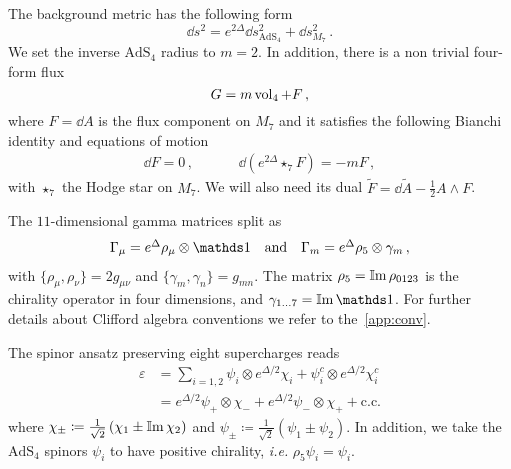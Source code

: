 \documentclass[debug]{phd}
\begin{document}
The background metric has the following form 
%
	\begin{equation}
	\label{eq:metric_mtheory_ads4}
		\dd  s^2 = e^{2\Delta} \dd  s^2_{\mathrm{AdS}_4} + \dd  s^2_{M_7} \, .
	\end{equation}
%
We set the inverse $\mathrm{AdS}_4$ radius to $m=2$. In addition, there is a non trivial four-form flux 
%
	\begin{equation}
		G = m \operatorname{vol}_4 + F \, ,
	\end{equation}
%
where $F = \dd  A$ is the flux component on $M_7$ and it satisfies the following Bianchi identity and equations of motion 
%
	\begin{equation}
		\begin{array}{ccccc}
			\dd  F = 0\, , & & & &\dd ( e^{2\Delta} \star_7 F ) = - m F \, , 
	\end{array}
	\end{equation}
%
with $\star_7$ the Hodge star on $M_7$. 
We will also need its dual $\tilde{F} = \dd  \tilde{A} - \tfrac{1}{2} A \wedge F$. 

%
%
%
%
	
The $11$-dimensional gamma matrices split as 
%
	\begin{equation}
	\label{eq:dec_gammas_m7}
		\begin{array}{ccc}
			\Gamma_{\mu} = e^{\Delta} \rho_{\mu} \otimes \id & \mbox{and} & \Gamma_m = e^{\Delta} \rho_5 \otimes \gamma_m\, ,
		\end{array}
	\end{equation}
%
with $\{\rho_{\mu}, \rho_{\nu}\}=2 g_{\mu \nu}$ and $\{\gamma_m, \gamma_n\}= g_{mn}$. 
The matrix $\rho_5 = \operatorname{\mathbb{I}m} \rho_{0123}$ is the chirality operator in four dimensions, and $\gamma_{1 \ldots 7}=\IIm \id$.
For further details about Clifford algebra conventions we refer to the~\cref{app:conv}.

The spinor ansatz preserving eight supercharges reads~\cite{Gabella:2012rc, Gabella:2011sg}
%
	\begin{equation}
	\label{eq:spinor_m7}
		\begin{split}
			\varepsilon &= \sum_{i=1,2} \psi_i \otimes e^{\Delta/2} \chi_i + \psi^c_i \otimes e^{\Delta/2} \chi_i^c\\
					&= e^{\Delta/2} \psi_+ \otimes \chi_- + e^{\Delta/2} \psi_- \otimes \chi_+ + \mathrm{c.c.} 
		\end{split}
	\end{equation}
%
where $\chi_{\pm} \coloneqq \tfrac{1}{\sqrt{2}} \left( \chi_1 \pm \operatorname{\mathbb{I}m} \chi_2\right)$ and $\psi_{\pm} \coloneqq \tfrac{1}{\sqrt{2}} \left( \psi_1 \pm \psi_2\right)$. 
In addition, we take the $\mathrm{AdS}_4$ spinors $\psi_i$ to have positive chirality, \emph{i.e.} $\rho_5 \psi_i = \psi_i$.\\
\end{document}
